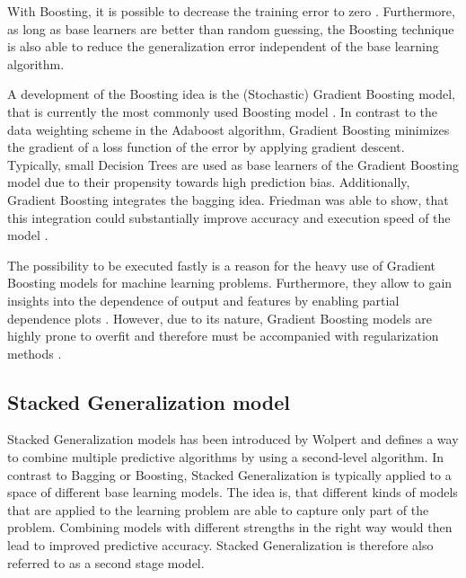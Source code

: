 \documentclass[12pt]{article}
\begin{document}
With Boosting, it is possible to decrease the training error to zero \citep[p.11ff.]{freund1996experiments}. Furthermore, as long as base learners are better than random guessing, the Boosting technique is also able to reduce the generalization error independent of the base learning algorithm.

A development of the Boosting idea is the (Stochastic) Gradient Boosting model, that is currently the most commonly used Boosting model \citep{friedman2001greedy, friedman2002stochastic}. In contrast to the data weighting scheme in the Adaboost algorithm, Gradient Boosting minimizes the gradient of a loss function of the error by applying gradient descent. Typically, small Decision Trees are used as base learners of the Gradient Boosting model due to their propensity towards high prediction bias. Additionally, Gradient Boosting integrates the bagging idea. Friedman was able to show, that this integration could substantially improve accuracy and execution speed of the model \citep{friedman2002stochastic}.

The possibility to be executed fastly is a reason for the heavy use of Gradient Boosting models for machine learning problems. Furthermore, they allow to gain insights into the dependence of output and features by enabling partial dependence plots \citep[p.1219ff.]{friedman2001greedy}. However, due to its nature, Gradient Boosting models are highly prone to overfit and therefore must be accompanied with regularization methods \citep[p.1203]{friedman2002stochastic}.


\subsection{Stacked Generalization model}
Stacked Generalization models has been introduced by Wolpert \citeyear{wolpert1992stacked} and defines a way to combine multiple predictive algorithms by using a second-level algorithm. In contrast to Bagging or Boosting, Stacked Generalization is typically applied to a space of different base learning models. The idea is, that different kinds of models that are applied to the learning problem are able to capture only part of the problem. Combining models with different strengths in the right way would then lead to improved predictive accuracy. Stacked Generalization is therefore also referred to as a second stage model.
\end{document}
